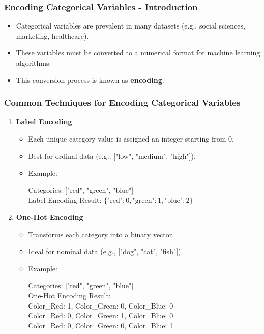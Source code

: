 \documentclass[aspectratio=169]{beamer}
\begin{document}
\begin{frame}[fragile]
    \frametitle{Encoding Categorical Variables - Introduction}
    \begin{itemize}
        \item Categorical variables are prevalent in many datasets (e.g., social sciences, marketing, healthcare).
        \item These variables must be converted to a numerical format for machine learning algorithms.
        \item This conversion process is known as \textbf{encoding}.
    \end{itemize}
\end{frame}

\begin{frame}[fragile]
    \frametitle{Common Techniques for Encoding Categorical Variables}
    \begin{enumerate}
        \item \textbf{Label Encoding}
            \begin{itemize}
                \item Each unique category value is assigned an integer starting from 0.
                \item Best for ordinal data (e.g., ["low", "medium", "high"]).
                \item Example: 
                \begin{block}{}
                    Categories: ["red", "green", "blue"] \\
                    Label Encoding Result: $\{ \text{"red"}: 0, \text{"green"}: 1, \text{"blue"}: 2 \}$
                \end{block}
            \end{itemize}
        \item \textbf{One-Hot Encoding}
            \begin{itemize}
                \item Transforms each category into a binary vector.
                \item Ideal for nominal data (e.g., ["dog", "cat", "fish"]).
                \item Example: 
                \begin{block}{}
                    Categories: ["red", "green", "blue"] \\
                    One-Hot Encoding Result: \\
                    Color\_Red: 1, Color\_Green: 0, Color\_Blue: 0 \\
                    Color\_Red: 0, Color\_Green: 1, Color\_Blue: 0 \\
                    Color\_Red: 0, Color\_Green: 0, Color\_Blue: 1
                \end{block}
            \end{itemize}
    \end{enumerate}
\end{frame}
\end{document}
